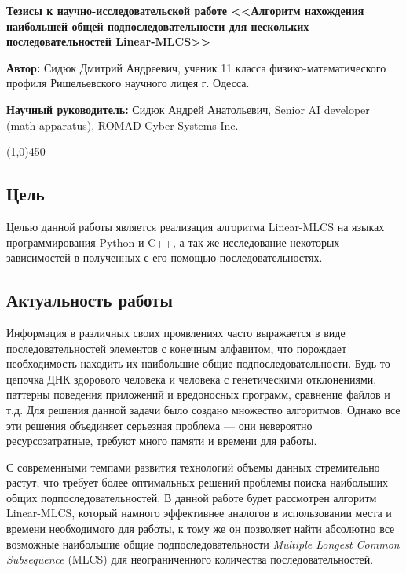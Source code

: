 \documentclass[a4paper,12pt]{extarticle}
\begin{document}
\begin{center}
  \large{\textbf{Тезисы к научно-исследовательской работе <<Алгоритм нахождения наибольшей общей подпоследовательности для нескольких последовательностей Linear-MLCS>>}}
\end{center}

\noindent\textbf{Автор:} Сидюк Дмитрий Андреевич, ученик 11 класса физико-математического профиля Ришельевского научного лицея г. Одесса.

\noindent\textbf{Научный руководитель:} Сидюк Андрей Анатольевич, Senior AI developer (math apparatus), ROMAD Cyber Systems Inc.

\begin{center}
  \line(1,0){450}
\end{center}

\subsection*{Цель}
\vspace{-0.2cm}
Целью данной работы является реализация алгоритма Linear-MLCS на языках программирования Python и C++, а так же исследование некоторых зависимостей в полученных с его помощью последовательностях.

\vspace{-0.5cm}
\subsection*{Актуальность работы}
\vspace{-0.2cm}
Информация в различных своих проявлениях часто выражается в виде последовательностей элементов с конечным алфавитом, что порождает необходимость находить их наибольшие общие подпоследовательности. Будь то цепочка ДНК здорового человека и человека с генетическими отклонениями, паттерны поведения приложений и вредоносных программ, сравнение файлов и т.д. Для решения данной задачи было создано множество алгоритмов. Однако все эти решения объединяет серьезная проблема — они невероятно ресурсозатратные, требуют много памяти и времени для работы.

С современными темпами развития технологий объемы данных стремительно растут, что требует более оптимальных решений проблемы поиска наибольших общих подпоследовательностей. В данной работе будет рассмотрен алгоритм Linear-MLCS, который намного эффективнее аналогов в использовании места и времени необходимого для работы, к тому же он позволяет найти абсолютно все возможные наибольшие общие подпоследовательности \textit{Multiple Longest Common Subsequence} (MLCS) для неограниченного количества последовательностей.
\end{document}
